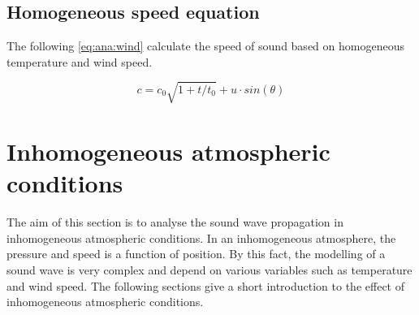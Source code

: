  
 \subsection{Homogeneous speed equation}\label{sec:ana:inhom_ats_con}
 The following \autoref{eq:ana:wind} calculate the speed of sound based on homogeneous temperature and wind speed.

\begin{equation}\label{eq:ana:wind}
c =  c_0 \sqrt{1+t/t_0} + u \cdot sin(\theta)
\end{equation}  

\startexplain
{}
\stopexplain


 
\section{Inhomogeneous atmospheric conditions} 
The aim of this section is to analyse the sound wave propagation in inhomogeneous atmospheric conditions. In an inhomogeneous atmosphere, the pressure and speed is a function of position. By this fact, the modelling of a sound wave is very complex and depend on various variables such as temperature and wind speed. The following sections give a short introduction to the effect of inhomogeneous atmospheric conditions. 
 
 
